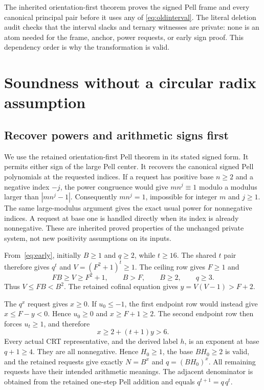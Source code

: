\documentclass[10pt,letterpaper]{article}
\theoremstyle{definition}\newtheorem{definition}[theorem]{Definition}
\begin{document}
The inherited orientation-first theorem proves the signed Pell frame and
every canonical principal pair before it uses any of
\eqref{eq:oldinterval}. The literal deletion audit checks that the interval
slacks and ternary witnesses are private: none is an atom needed for the
frame, anchor, power requests, or early sign proof. This dependency order
is why the transformation is valid.

\section{Soundness without a circular radix assumption}\label{sec:soundness}

\subsection{Recover powers and arithmetic signs first}

We use the retained orientation-first Pell theorem in its stated signed
form. It permits either sign of the large Pell center. It recovers the
canonical signed Pell polynomials at the requested indices. If a request
has positive base $n\ge2$ and a negative index $-j$, the power congruence
would give $m n^j\equiv1$ modulo a modulus larger than
$|m n^j-1|$. Consequently $m n^j=1$, impossible for integer $m$ and
$j\ge1$. The same large-modulus argument gives the exact usual power for
nonnegative indices. A request at base one is handled directly when its
index is already nonnegative. These are inherited proved properties of
the unchanged private system, not new positivity assumptions on its inputs.

From~\eqref{eq:early}, initially $B\ge1$ and $q\ge2$, while
$t\ge16$. The shared $t$ pair therefore gives $q^t$ and
$V=(F^2+1)^t\ge1$. The ceiling row gives $F\ge1$ and
\[
 FB\ge V\ge F^2+1,\qquad B>F,\qquad B\ge2,\qquad q\ge3.
\]
Thus $V\le FB<B^2$. The retained cofinal equation gives
$y=V(V-1)>F+2$.

The $q^x$ request gives $x\ge0$. If $u_0\le-1$, the first endpoint row
would instead give $x\le F-y<0$. Hence $u_0\ge0$ and $x\ge F+1\ge2$.
The second endpoint row then forces $u_t\ge1$, and therefore
\begin{equation}\label{eq:xbig}
 x\ge2+(t+1)y>6.
\end{equation}
Every actual CRT representative, and the derived label $h$, is an exponent
at base $q+1\ge4$. They are all nonnegative. Hence $H_0\ge1$, the base
$BH_0\ge2$ is valid, and the retained requests give exactly
$N=B^x$ and $q=(BH_0)^x$. All remaining requests have their intended
arithmetic meanings. The adjacent denominator is obtained from the
retained one-step Pell addition and equals $q^{t+1}=q\,q^t$.
\end{document}

